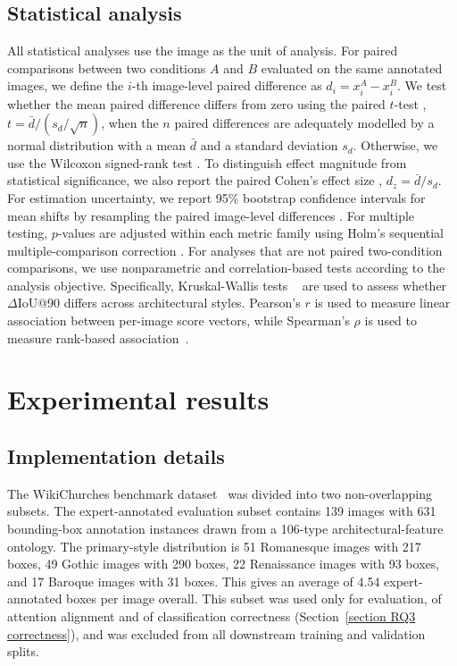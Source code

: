 \documentclass[lineno,pdflatex,sn-mathphys-num]{sn-jnl}%
\theoremstyle{thmstyleone}%
\theoremstyle{thmstyletwo}%
\theoremstyle{thmstylethree}%
\begin{document}
\subsection{Statistical analysis}

All statistical analyses use the image as the unit of analysis. For paired comparisons between two conditions $A$ and $B$ evaluated on the same annotated images, we define the $i$-th image-level paired difference as $d_i=x_i^A-x_i^B$. We test whether the mean paired difference differs from zero using the paired $t$-test \cite{SciPy}, $t=\bar d/(s_d/\sqrt n)$, when the $n$ paired differences are adequately modelled by a normal distribution with a mean $\bar d$ and a standard deviation $s_d$. Otherwise, we use the Wilcoxon signed-rank test \cite{SciPy}. To distinguish effect magnitude from statistical significance, we also report the paired Cohen's effect size \cite{Cohen1988, Lakens2013}, $d_z=\bar d/s_d$. For estimation uncertainty, we report 95\% bootstrap confidence intervals for mean shifts by resampling the paired image-level differences \cite{SciPy}. For multiple testing, $p$-values are adjusted within each metric family using Holm's sequential multiple-comparison correction \cite{Holm1979}. For analyses that are not paired two-condition comparisons, we use nonparametric and correlation-based tests according to the analysis objective. Specifically, Kruskal-Wallis tests ~\cite{SciPy} are used to assess whether $\Delta$IoU@90 differs across architectural styles. Pearson's $r$ is used to measure linear association between per-image score vectors, while Spearman's $\rho$ is used to measure rank-based association~\cite{SciPy}.


\section{Experimental results} \label{section results}

\subsection{Implementation details}

The WikiChurches benchmark dataset~\cite{Barz21WikiChurches} was divided into two non-overlapping subsets. The expert-annotated evaluation subset contains 139 images with 631 bounding-box annotation instances drawn from a 106-type architectural-feature ontology. The primary-style distribution is 51 Romanesque images with 217 boxes, 49 Gothic images with 290 boxes, 22 Renaissance images with 93 boxes, and 17 Baroque images with 31 boxes. This gives an average of 4.54 expert-annotated boxes per image overall. This subset was used only for evaluation, of attention alignment and of classification correctness (Section~\ref{section RQ3 correctness}), and was excluded from all downstream training and validation splits.
\end{document}
